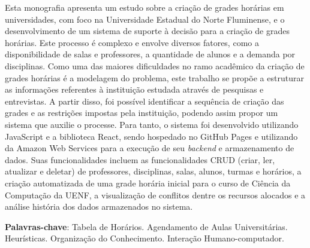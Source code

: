 \setlength{\absparsep}{18pt} %
\begin{resumo}

  Esta monografia apresenta um estudo sobre a criação de grades horárias em universidades, com foco na Universidade Estadual do Norte Fluminense, e o desenvolvimento de um sistema de suporte à decisão para a criação de grades horárias. Este processo é complexo e envolve diversos fatores, como a disponibilidade de salas e professores, a quantidade de alunos e a demanda por disciplinas. Como uma das maiores dificuldades no ramo acadêmico da criação de grades horárias é a modelagem do problema, este trabalho se propõe a estruturar as informações referentes à instituição estudada através de pesquisas e entrevistas. A partir disso, foi possível identificar a sequência de criação das grades e as restrições impostas pela instituição, podendo assim propor um sistema que auxilie o processe. Para tanto, o sistema foi desenvolvido utilizando JavaScript e a biblioteca React, sendo hospedado no GitHub Pages e utilizando da Amazon Web Services para a execução de seu \textit{backend} e armazenamento de dados. Suas funcionalidades incluem as funcionalidades CRUD (criar, ler, atualizar e deletar) de professores, disciplinas, salas, alunos, turmas e horários, a criação automatizada de uma grade horária inicial para o curso de Ciência da Computação da UENF, a visualização de conflitos dentre os recursos alocados e a análise história dos dados armazenados no sistema.

  \textbf{Palavras-chave}: Tabela de Horários. Agendamento de Aulas Universitárias. Heurísticas. Organização do Conhecimento. Interação Humano-computador.




\end{resumo}

